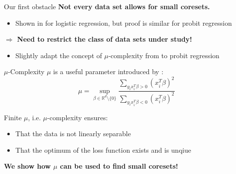 \documentclass[gray]{beamer}
\begin{document}
\begin{frame}{Our first obstacle}
    \textbf{Not every data set allows for small coresets.}
    \begin{itemize}
        \item Shown in \cite{on-coresets} for logistic regression,
              but proof is similar for probit regression
    \end{itemize}

    \vspace{\fill}

    \textbf{$\Rightarrow$ Need to restrict the class of data sets under study!}
    \begin{itemize}
        \item Slightly adapt the concept of $\mu$-complexity from
              \cite{on-coresets} to probit regression
    \end{itemize}
\end{frame}

\begin{frame}{$\mu$-Complexity}
    $\mu$ is a useful parameter introduced by \cite{on-coresets}:
    \begin{equation*}
        \mu = \sup_{\beta \in \mathbb{R}^d \setminus \{0\} }
        \frac{\sum_{y_ix_i^T\beta > 0} (x_i^T \beta)^2}
        {\sum_{y_ix_i^T\beta < 0}(x_i^T \beta)^2}
    \end{equation*}

    \vspace{\fill}

    Finite $\mu$, i.e. $\mu$-complexity ensures:
    \begin{itemize}
        \item That the data is not linearly separable
        \item That the optimum of the loss function exists and is unqiue
    \end{itemize}

    \vspace{\fill}

    \textbf{We show how $\mu$ can be used to find small coresets!}
\end{frame}
\end{document}
